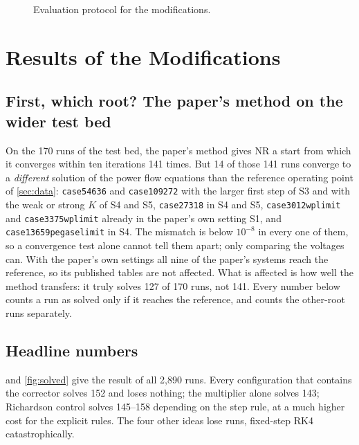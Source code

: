 \documentclass[11pt,a4paper]{article}
\newcommand{\ninf}[1]{\lVert #1\rVert_\infty}
\newcommand{\code}[1]{\texttt{#1}}
\begin{document}
\begin{figure}[!htbp]
\caption[Evaluation protocol for the modifications]{Evaluation protocol for the modifications.}
\label{fig:protocol}
\end{figure}

\section{Results of the Modifications}\label{sec:modresults}

\subsection{First, which root? The paper's method on the wider test bed}\label{sec:rootcheck}
On the 170 runs of the test bed, the paper's method gives NR a start from which it converges within ten
iterations 141 times. But 14 of those 141 runs converge to a \emph{different} solution of the power flow
equations than the reference operating point of \cref{sec:data}: \code{case54636} and \code{case109272}
with the larger first step of S3 and with the weak or strong $K$ of S4 and S5, \code{case27318} in S4 and S5,
\code{case3012wplimit} and \code{case3375wplimit} already in the paper's own setting S1, and
\code{case13659pegaselimit} in S4. The mismatch is below $10^{-8}$ in every one of them, so a
convergence test alone cannot tell them apart; only comparing the voltages can. With the paper's own
settings all nine of the paper's systems reach the reference, so its published tables are not affected.
What is affected is how well the method transfers: it truly solves 127 of 170 runs, not 141. Every number
below counts a run as solved only if it reaches the reference, and counts the other-root runs separately.

\subsection{Headline numbers}
 and \cref{fig:solved} give the result of all 2{,}890 runs. Every configuration that
contains the corrector solves 152 and loses nothing; the multiplier alone solves 143; Richardson control
solves 145--158 depending on the step rule, at a much higher cost for the explicit rules. The four other
ideas lose runs, fixed-step RK4 catastrophically.
\end{document}

